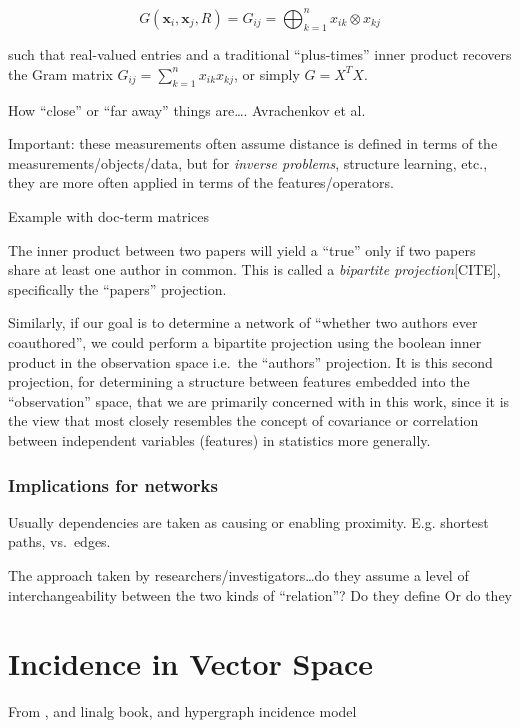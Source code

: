 \documentclass[%
	12pt,
		oneside,
		letterpaper
]{book}
\begin{document}
\[G(\mathbf{x}_i, \mathbf{x}_j,R) = G_{ij} = \bigoplus_{k=1}^{n} x_{ik} \otimes x_{kj} \]

such that real-valued entries and a traditional ``plus-times'' inner
product recovers the Gram matrix \(G_{ij}=\sum_{k=1}^{n} x_{ik}x_{kj}\),
or simply \(G=X^TX\).

How ``close'' or ``far away'' things are\ldots. Avrachenkov et al.~

Important: these measurements often assume distance is defined in terms
of the measurements/objects/data, but for \emph{inverse problems},
structure learning, etc., they are more often applied in terms of the
features/operators.

Example with doc-term matrices

The inner product between two papers will yield a ``true'' only if two
papers share at least one author in common. This is called a
\emph{bipartite projection}{[}CITE{]}, specifically the ``papers''
projection.

Similarly, if our goal is to determine a network of ``whether two
authors ever coauthored'', we could perform a bipartite projection using
the boolean inner product in the observation space i.e.~the ``authors''
projection. It is this second projection, for determining a structure
between features embedded into the ``observation'' space, that we are
primarily concerned with in this work, since it is the view that most
closely resembles the concept of covariance or correlation between
independent variables (features) in statistics more generally.

\subsection{Implications for networks}\label{implications-for-networks}

Usually dependencies are taken as causing or enabling proximity. E.g.
shortest paths, vs.~edges.

The approach taken by researchers/investigators\ldots do they assume a
level of interchangeability between the two kinds of ``relation''? Do
they define Or do they

\chapter{Incidence in Vector Space}\label{incidence-in-vector-space}

From \autocite{WhyHowWhen_Torres2021}, and linalg book, and hypergraph
incidence model
\end{document}
